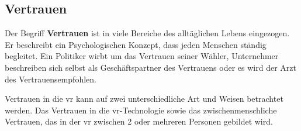 \documentclass[a4paper,11pt]{article}%
\renewcommand{\\}{\vspace*{0.5\baselineskip} \newline}
\begin{document}
%




	





\newpage

	\subsection{Vertrauen}
	\label{Vertrauen}
Der Begriff \textbf{Vertrauen} ist in viele Bereiche des alltäglichen Lebens eingezogen. Er beschreibt ein Psychologischen Konzept, dass jeden Menschen ständig begleitet.
Ein Politiker wirbt um das Vertrauen seiner Wähler, Unternehmer beschreiben sich selbst als Geschäftspartner des Vertrauens oder es \dq wird der Arzt des Vertrauens\dq empfohlen.

Vertrauen in die \ac{vr} kann auf zwei unterschiedliche Art und Weisen betrachtet werden. Das Vertrauen in die \ac{vr}-Technologie sowie das zwischenmenschliche Vertrauen, das in der \ac{vr} zwischen 2 oder mehreren Personen gebildet wird.
\end{document}
